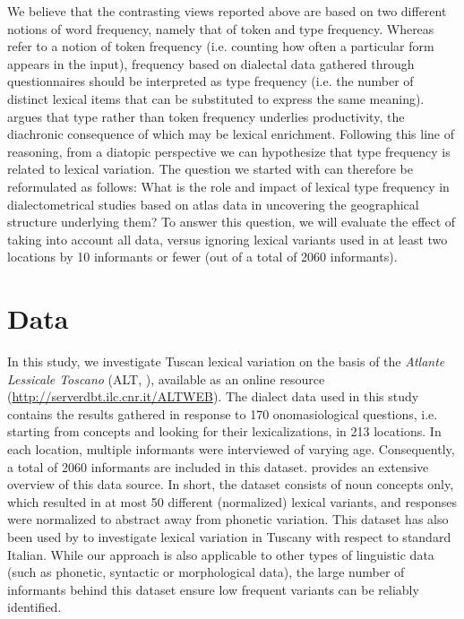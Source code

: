 \documentclass[output=paper]{LSP/langsci}
\begin{document}
We believe that the contrasting views reported above are based on two different notions of word frequency, namely that of token and type frequency. Whereas \citet{manning_foundations_1999} refer to a notion of token frequency (i.e. counting how often a particular form appears in the input), frequency based on dialectal data gathered through questionnaires should be interpreted as type frequency (i.e.  the number of distinct lexical items that can be substituted to express the same meaning). \citet{bybee_phonology_2001} argues that type rather than token frequency underlies productivity, the diachronic consequence of which may be lexical enrichment. Following this line of reasoning, from a diatopic perspective we can hypothesize that type frequency is related  to lexical variation. The question we started with can therefore be reformulated as follows: What is the role and impact of lexical type frequency in dialectometrical studies based on atlas data in uncovering the geographical structure underlying them? To answer this question, we will evaluate the effect of taking into account all data, versus ignoring lexical variants used in at least two locations by 10 informants or fewer (out of a total of 2060 informants).

\section{Data}
In this study, we investigate Tuscan lexical variation on the basis of the \textit{Atlante Lessicale Toscano} (ALT, \citealt{giacomelli_atlante_2000}), available as an online resource (\url{http://serverdbt.ilc.cnr.it/ALTWEB}). The dialect data used in this study contains the results gathered in response to 170 onomasiological questions, i.e. starting from concepts and looking for their lexicalizations, in 213 locations. In each location, multiple informants were interviewed of varying age. Consequently, a total of 2060 informants are included in this dataset. \citet{montemagni_tracking_2015} provides an extensive overview of this data source. In short, the dataset consists of noun concepts only, which resulted in at most 50 different (normalized) lexical variants, and responses were normalized to abstract away from phonetic variation. This dataset has also been used by \citet{wieling_lexical_2014} to investigate lexical variation in Tuscany with respect to standard Italian. While our approach is also applicable to other types of linguistic data (such as phonetic, syntactic or morphological data), the large number of informants behind this dataset ensure low frequent variants can be reliably identified.
\end{document}
